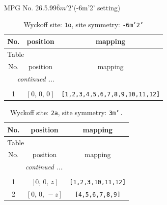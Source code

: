 \documentclass[fleqn,8pt]{jsarticle}
\begin{document}
\setcounter{MaxMatrixCols}{32}

\renewcommand{\tablename}{Table~}
\renewcommand{\figurename}{Figure~}
\begin{center}
\LARGE
MPG No. 26.5.99\quad$\bar{6}m'2'$\quad(-6m'2' setting)
\end{center}
\renewcommand{\arraystretch}{1.2}
\begin{longtable}{ccc}
\caption{Wyckoff site: {\tt 1o}, site symmetry: {\tt -6m'2'}}
 \\
 \hline \hline
No. & position & mapping \\ \hline \endfirsthead

\multicolumn{2}{l}{\tablename\ \thetable{}} \\
 \hline \hline
No. & position & mapping \\ \hline \endhead

 \hline \hline
\multicolumn{2}{r}{\footnotesize\it continued ...} \\ \endfoot

 \hline \hline
\multicolumn{2}{r}{} \\ \endlastfoot

1 & $\left[ 0,\, 0,\, 0 \right]$ & {\tt [1,2,3,4,5,6,7,8,9,10,11,12]} \\
\end{longtable}
\renewcommand{\arraystretch}{1.2}
\begin{longtable}{ccc}
\caption{Wyckoff site: {\tt 2a}, site symmetry: {\tt 3m'.}}
 \\
 \hline \hline
No. & position & mapping \\ \hline \endfirsthead

\multicolumn{2}{l}{\tablename\ \thetable{}} \\
 \hline \hline
No. & position & mapping \\ \hline \endhead

 \hline \hline
\multicolumn{2}{r}{\footnotesize\it continued ...} \\ \endfoot

 \hline \hline
\multicolumn{2}{r}{} \\ \endlastfoot

1 & $\left[ 0,\, 0,\, z \right]$ & {\tt [1,2,3,10,11,12]} \\ \hline
2 & $\left[ 0,\, 0,\, - z \right]$ & {\tt [4,5,6,7,8,9]} \\
\end{longtable}
\renewcommand{\arraystretch}{1.2}
\end{document}
